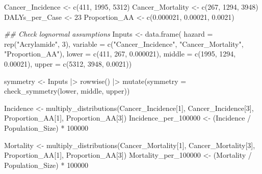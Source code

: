 \documentclass[
  letterpaper,
  DIV=11,
  numbers=noendperiod]{scrartcl}
\newenvironment{Shaded}{\begin{snugshade}}{\end{snugshade}}
\newcommand{\AttributeTok}[1]{\textcolor[rgb]{0.40,0.45,0.13}{#1}}
\newcommand{\DecValTok}[1]{\textcolor[rgb]{0.68,0.00,0.00}{#1}}
\newcommand{\DocumentationTok}[1]{\textcolor[rgb]{0.37,0.37,0.37}{\textit{#1}}}
\newcommand{\FloatTok}[1]{\textcolor[rgb]{0.68,0.00,0.00}{#1}}
\newcommand{\FunctionTok}[1]{\textcolor[rgb]{0.28,0.35,0.67}{#1}}
\newcommand{\NormalTok}[1]{\textcolor[rgb]{0.00,0.23,0.31}{#1}}
\newcommand{\OtherTok}[1]{\textcolor[rgb]{0.00,0.23,0.31}{#1}}
\newcommand{\SpecialCharTok}[1]{\textcolor[rgb]{0.37,0.37,0.37}{#1}}
\newcommand{\StringTok}[1]{\textcolor[rgb]{0.13,0.47,0.30}{#1}}
\begin{document}
\begin{Shaded}
\begin{Highlighting}[]
\NormalTok{Cancer\_Incidence }\OtherTok{\textless{}{-}} \FunctionTok{c}\NormalTok{(}\DecValTok{411}\NormalTok{, }\DecValTok{1995}\NormalTok{, }\DecValTok{5312}\NormalTok{)}
\NormalTok{Cancer\_Mortality }\OtherTok{\textless{}{-}} \FunctionTok{c}\NormalTok{(}\DecValTok{267}\NormalTok{, }\DecValTok{1294}\NormalTok{, }\DecValTok{3948}\NormalTok{)}
\NormalTok{DALYs\_per\_Case }\OtherTok{\textless{}{-}} \DecValTok{23}
\NormalTok{Proportion\_AA }\OtherTok{\textless{}{-}} \FunctionTok{c}\NormalTok{(}\FloatTok{0.000021}\NormalTok{, }\FloatTok{0.00021}\NormalTok{, }\FloatTok{0.0021}\NormalTok{)}

\DocumentationTok{\#\# Check lognormal assumptions}
\NormalTok{Inputs }\OtherTok{\textless{}{-}} \FunctionTok{data.frame}\NormalTok{(}
 \AttributeTok{hazard =} \FunctionTok{rep}\NormalTok{(}\StringTok{"Acrylamide"}\NormalTok{,  }\DecValTok{3}\NormalTok{), }
 \AttributeTok{variable =} \FunctionTok{c}\NormalTok{(}\StringTok{"Cancer\_Incidence"}\NormalTok{,  }\StringTok{"Cancer\_Mortality"}\NormalTok{, }\StringTok{"Proportion\_AA"}\NormalTok{), }
 \AttributeTok{lower =} \FunctionTok{c}\NormalTok{(}\DecValTok{411}\NormalTok{,  }\DecValTok{267}\NormalTok{, }\FloatTok{0.000021}\NormalTok{), }
 \AttributeTok{middle =} \FunctionTok{c}\NormalTok{(}\DecValTok{1995}\NormalTok{,  }\DecValTok{1294}\NormalTok{,  }\FloatTok{0.00021}\NormalTok{), }
 \AttributeTok{upper =} \FunctionTok{c}\NormalTok{(}\DecValTok{5312}\NormalTok{,  }\DecValTok{3948}\NormalTok{,  }\FloatTok{0.0021}\NormalTok{))}

\NormalTok{symmetry }\OtherTok{\textless{}{-}}\NormalTok{ Inputs }\SpecialCharTok{|\textgreater{}}
 \FunctionTok{rowwise}\NormalTok{() }\SpecialCharTok{|\textgreater{}}
 \FunctionTok{mutate}\NormalTok{(}\AttributeTok{symmetry =} \FunctionTok{check\_symmetry}\NormalTok{(lower,  middle,  upper))}

\NormalTok{Incidence }\OtherTok{\textless{}{-}} \FunctionTok{multiply\_distributions}\NormalTok{(Cancer\_Incidence[}\DecValTok{1}\NormalTok{], Cancer\_Incidence[}\DecValTok{3}\NormalTok{], Proportion\_AA[}\DecValTok{1}\NormalTok{], Proportion\_AA[}\DecValTok{3}\NormalTok{])}
\NormalTok{Incidence\_per\_100000 }\OtherTok{\textless{}{-}}\NormalTok{ (Incidence }\SpecialCharTok{/}\NormalTok{ Population\_Size) }\SpecialCharTok{*} \DecValTok{100000}

\NormalTok{Mortality }\OtherTok{\textless{}{-}} \FunctionTok{multiply\_distributions}\NormalTok{(Cancer\_Mortality[}\DecValTok{1}\NormalTok{], Cancer\_Mortality[}\DecValTok{3}\NormalTok{], Proportion\_AA[}\DecValTok{1}\NormalTok{], Proportion\_AA[}\DecValTok{3}\NormalTok{])}
\NormalTok{Mortality\_per\_100000 }\OtherTok{\textless{}{-}}\NormalTok{ (Mortality }\SpecialCharTok{/}\NormalTok{ Population\_Size) }\SpecialCharTok{*} \DecValTok{100000}


\end{Highlighting}
\end{Shaded}
\end{document}
